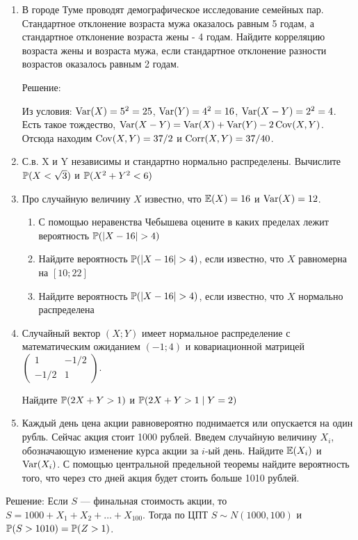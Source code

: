 \documentclass[12pt, a4paper]{article}\usepackage[]{graphicx}\usepackage[]{color}
\begin{document}
	\begin{enumerate}
		\item В  городе Туме проводят демографическое исследование семейных пар. Стандартное отклонение возраста мужа оказалось равным 5 годам, а стандартное отклонение возраста жены - 4 годам. Найдите корреляцию возраста жены и возраста мужа, если стандартное отклонение разности возрастов оказалось равным 2 годам.


		Решение:

		Из условия: $\Var(X)=5^2=25$, $\Var(Y)=4^2=16$, $\Var(X-Y)=2^2=4$. Есть такое тождество, $\Var(X-Y)=\Var(X)+\Var(Y)-2\Cov(X,Y)$. Отсюда находим $\Cov(X,Y)=37/2$ и $\Corr(X,Y)=37/40$.

		\item С.в. X и Y независимы и стандартно нормально распределены. Вычислите $\P(X<\sqrt{3})$ и $\P(X^2+Y^2<6)$

		\item  Про случайную величину $X$ известно, что $\E(X)=16$ и $\Var(X)=12$.
		\begin{enumerate}
			\item С помощью неравенства Чебышева оцените в каких пределах лежит вероятность $\P(|X-16|>4)$
			\item Найдите вероятность $\P(|X-16|>4)$, если известно, что $X$ равномерна на $[10;22]$
			\item Найдите вероятность $\P(|X-16|>4)$, если известно, что $X$ нормально распределена
		\end{enumerate}


		\item Случайный вектор $(X;Y)$ имеет нормальное распределение с математическим ожиданием $(-1;4)$ и ковариационной матрицей $\left( \begin{array}{cc}
		1 & -1/2 \\
		-1/2 & 1
		\end{array} \right)$.


		Найдите   $\P(2X+Y>1)$ и $\P(2X+Y>1 \mid Y=2)$

		\item Каждый день цена акции равновероятно поднимается или опускается на один рубль. Сейчас акция стоит 1000 рублей. Введем случайную величину $X_i$, обозначающую изменение курса акции за $i$-ый день. Найдите $\E(X_i)$  и $\Var(X_i)$. С помощью центральной предельной теоремы найдите вероятность того, что через сто дней акция будет стоить больше 1010 рублей.
	\end{enumerate}

	Решение: Если $S$ — финальная стоимость акции, то $S=1000+X_1+X_2+\ldots+X_{100}$. Тогда по ЦПТ $S\sim N(1000,100)$ и $\P(S>1010)=\P(Z>1)$.
\end{document}
